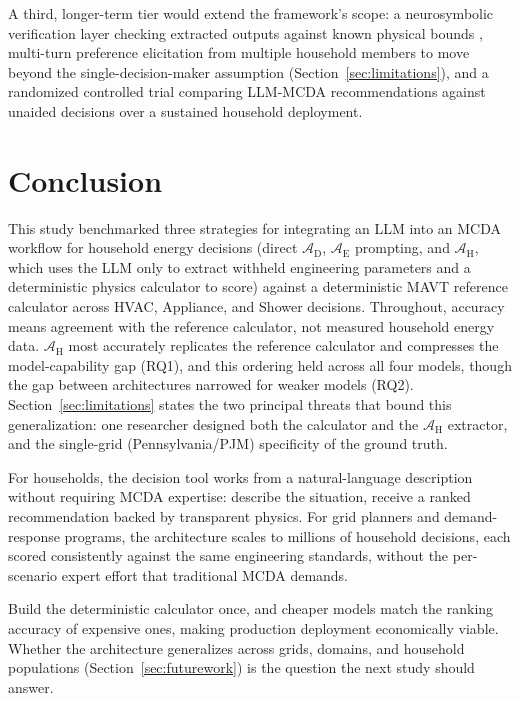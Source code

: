 \documentclass[final,3p,times]{elsarticle}
\begin{document}
A third, longer-term tier would extend the framework's scope: a neurosymbolic verification layer checking extracted outputs against known physical bounds \cite{mattas2026neurosymbolic,ye2023satlm}, multi-turn preference elicitation from multiple household members to move beyond the single-decision-maker assumption (Section~\ref{sec:limitations}), and a randomized controlled trial comparing LLM-MCDA recommendations against unaided decisions over a sustained household deployment.

\FloatBarrier
\section{Conclusion}
\label{sec:conclusion}
This study benchmarked three strategies for integrating an LLM into an MCDA workflow for household energy decisions (direct $\mathcal{A}_{\text{D}}$, $\mathcal{A}_{\text{E}}$ prompting, and $\mathcal{A}_{\text{H}}$, which uses the LLM only to extract withheld engineering parameters and a deterministic physics calculator to score) against a deterministic MAVT reference calculator across HVAC, Appliance, and Shower decisions. Throughout, accuracy means agreement with the reference calculator, not measured household energy data. $\mathcal{A}_{\text{H}}$ most accurately replicates the reference calculator and compresses the model-capability gap (RQ1), and this ordering held across all four models, though the gap between architectures narrowed for weaker models (RQ2). Section~\ref{sec:limitations} states the two principal threats that bound this generalization: one researcher designed both the calculator and the $\mathcal{A}_{\text{H}}$ extractor, and the single-grid (Pennsylvania/PJM) specificity of the ground truth.

For households, the decision tool works from a natural-language description without requiring MCDA expertise: describe the situation, receive a ranked recommendation backed by transparent physics. For grid planners and demand-response programs, the architecture scales to millions of household decisions, each scored consistently against the same engineering standards, without the per-scenario expert effort that traditional MCDA demands.

Build the deterministic calculator once, and cheaper models match the ranking accuracy of expensive ones, making production deployment economically viable. Whether the architecture generalizes across grids, domains, and household populations (Section~\ref{sec:futurework}) is the question the next study should answer.
\end{document}
